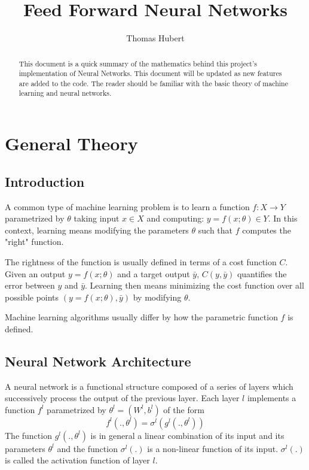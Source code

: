 \documentclass{article} %
\title{Feed Forward Neural Networks}
\author{Thomas Hubert}
\begin{document}
\maketitle

\begin{abstract}
This document is a quick summary of the mathematics behind this project's implementation of Neural Networks. This document will be updated as new features are added to the code. The reader should be familiar with the basic theory of machine learning and neural networks.
\end{abstract}

\tableofcontents
\newpage

\section{General Theory}
\subsection{Introduction}
A common type of machine learning problem is to learn a function $f:X \rightarrow Y$ parametrized by $\theta$ taking input $x\in X$ and computing: $y = f(x;\theta) \in Y$. In this context, learning means modifying the parameters $\theta$ such that $f$ computes the "right" function.

The rightness of the function is usually defined in terms of a cost function $C$. Given an output $y=f(x;\theta)$ and a target output  $\bar{y}$, $C(y,\bar{y})$ quantifies the error between $y$ and $\bar{y}$. Learning then means minimizing the cost function over all possible points $(y=f(x;\theta), \bar{y})$ by modifying $\theta$. 

Machine learning algorithms usually differ by how the parametric function $f$ is defined.

\subsection{Neural Network Architecture}
A neural network is a functional structure composed of a series of layers which successively process the output of the previous layer. Each layer $l$ implements a function $f^l$ parametrized by $\theta^l=(W^l, b^l)$ of the form 
$$
f^l(.,\theta^l)=\sigma^l \left(g^l(.,\theta^l)\right)
$$
The function $g^l(., \theta^l)$ is in general a linear combination of its input and its parameters $\theta^l$ and the function $\sigma^l(.)$ is a non-linear function of its input. $\sigma^l(.)$ is called the activation function of layer $l$.
\end{document}

